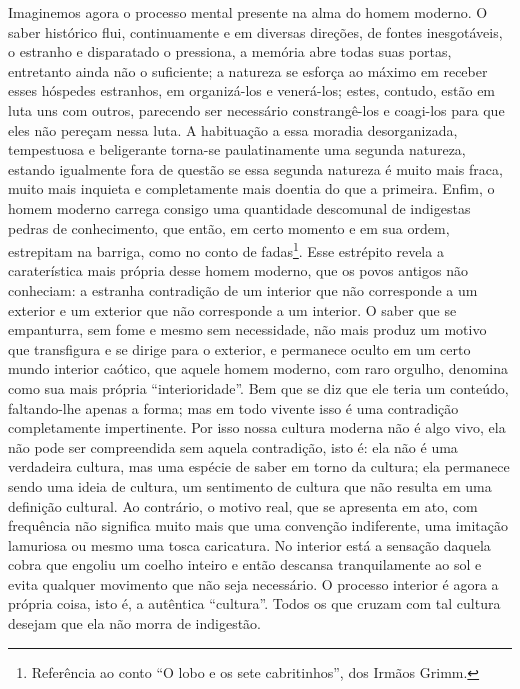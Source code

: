 \begin{enumerate}
    Imaginemos agora o processo mental presente na alma do homem
    moderno. O saber histórico flui, continuamente e em diversas
    direções, de fontes inesgotáveis, o estranho e disparatado o
    pressiona, a memória abre todas suas portas, entretanto ainda não o
    suficiente; a natureza se esforça ao máximo em receber esses
    hóspedes estranhos, em organizá-los e venerá-los; estes, contudo,
    estão em luta uns com outros, parecendo ser necessário
    constrangê-los e coagi-los para que eles não pereçam nessa luta. A
    habituação a essa moradia desorganizada, tempestuosa e beligerante
    torna-se paulatinamente uma segunda natureza, estando igualmente
    fora de questão se essa segunda natureza é muito mais fraca, muito
    mais inquieta e completamente mais doentia do que a primeira. Enfim,
    o homem moderno carrega consigo uma quantidade descomunal de
    indigestas pedras de conhecimento, que então, em certo momento e em
    sua ordem, estrepitam na barriga, como no conto de fadas\footnote{Referência
      ao conto ``O lobo e os sete cabritinhos'', dos Irmãos Grimm.}.
    Esse estrépito revela a caraterística mais própria desse homem
    moderno, que os povos antigos não conheciam: a estranha contradição
    de um interior que não corresponde a um exterior e um exterior que
    não corresponde a um interior. O saber que se empanturra, sem fome e
    mesmo sem necessidade, não mais produz um motivo que transfigura e
    se dirige para o exterior, e permanece oculto em um certo mundo
    interior caótico, que aquele homem moderno, com raro orgulho,
    denomina como sua mais própria ``interioridade''. Bem que se diz que
    ele teria um conteúdo, faltando-lhe apenas a forma; mas em todo
    vivente isso é uma contradição completamente impertinente. Por isso
    nossa cultura moderna não é algo vivo, ela não pode ser compreendida
    sem aquela contradição, isto é: ela não é uma verdadeira cultura,
    mas uma espécie de saber em torno da cultura; ela permanece sendo
    uma ideia de cultura, um sentimento de cultura que não resulta em
    uma definição cultural. Ao contrário, o motivo real, que se
    apresenta em ato, com frequência não significa muito mais que uma
    convenção indiferente, uma imitação lamuriosa ou mesmo uma tosca
    caricatura. No interior está a sensação daquela cobra que engoliu um
    coelho inteiro e então descansa tranquilamente ao sol e evita
    qualquer movimento que não seja necessário. O processo interior é
    agora a própria coisa, isto é, a autêntica ``cultura''. Todos os que
    cruzam com tal cultura desejam que ela não morra de indigestão.

\end{enumerate}
